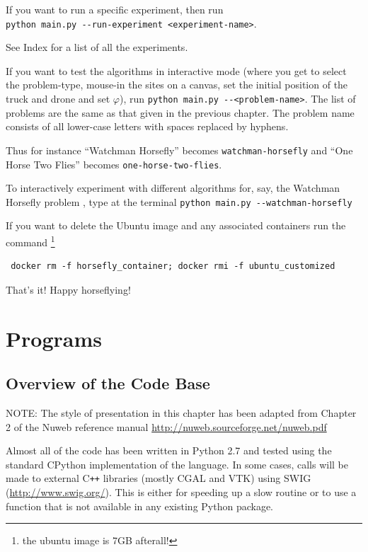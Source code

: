 \documentclass[12pt]{report}
\begin{document}
\begin{alphalist}
  If you want to run a specific experiment, then run \\ \verb|python main.py --run-experiment <experiment-name>|. 

  See Index for a list of all the experiments. 

\item {}  If you want to test the algorithms in interactive mode 
  (where you get to select the problem-type, mouse-in the sites on a canvas, set the initial position of 
  the truck and drone and set $\varphi$), run \verb|python main.py --<problem-name>|. The
  list of problems are the same as that given in the previous chapter. The problem name consists
  of all lower-case letters with spaces replaced by hyphens. 

  Thus for instance ``Watchman Horsefly'' becomes \verb|watchman-horsefly| and ``One Horse Two Flies''
  becomes \verb|one-horse-two-flies|. 

  To interactively experiment with different algorithms for, say, the Watchman Horsefly problem , 
  type at the terminal \verb|python main.py --watchman-horsefly|
\end{alphalist}

\vspace{1cm}

If you want to delete the Ubuntu image and any associated containers run the command \footnote{the ubuntu image is 7GB afterall!}
\begin{verbatim}
 docker rm -f horsefly_container; docker rmi -f ubuntu_customized
\end{verbatim}

That's it! Happy horseflying!
\part{Programs}
\chapter{Overview of the Code Base}
NOTE: {\footnotesize The style of presentation in this chapter has been adapted from 
Chapter 2 of the Nuweb reference manual \url{http://nuweb.sourceforge.net/nuweb.pdf}}

Almost all of the code has been written in Python 2.7 and tested using the standard CPython
implementation of the language. In some cases, calls will be made to external C\texttt{++} libraries (mostly CGAL and VTK) 
using SWIG (\url{http://www.swig.org/}). This is either for speeding up a slow 
routine or to use a function that is not available in any existing Python package.
\end{document}
